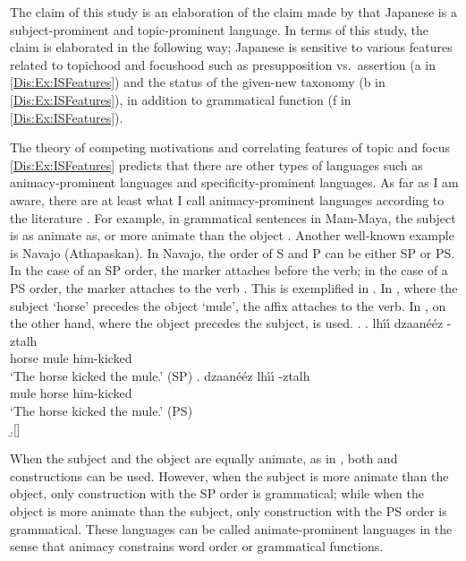 The claim of this study is an elaboration of the claim made by
 that
Japanese is a subject-prominent and topic-prominent language.
In terms of this study,
the claim is elaborated in the following way;
Japanese is sensitive to various features related to topichood and focushood such as presupposition vs.~assertion (a in \ref{Dis:Ex:ISFeatures})
and the status of the given-new taxonomy (b in \ref{Dis:Ex:ISFeatures}),
in addition to grammatical function (f in \ref{Dis:Ex:ISFeatures}).

The theory of competing motivations and correlating features of topic and focus \ref{Dis:Ex:ISFeatures} predicts that
there are other types of languages such as animacy-prominent languages and specificity-prominent languages.
As far as I am aware,
there are at least what I call animacy-prominent languages according to the literature \cite[]{dahlfraurud96,minkoff00,deswartetal07}.
For example, in grammatical sentences in Mam-Maya,
the subject is as animate as, or more animate than the object \cite{minkoff00}.
Another well-known example is Navajo (Athapaskan).
In Navajo, the order of S and P can be either SP or PS.
In the case of an SP order, the marker  attaches before the verb;
in the case of a PS order, the marker  attaches to the verb \cite{hale72,frischberg72}.
This is exemplified in \Next.
In \Next[a],
where the subject `horse' precedes the object `mule',
the affix  attaches to the verb.
In \Next[b], on the other hand,
where the object precedes the subject,
 is used.
%
\ex.
 \ag. lh\'{\i}\'{\i} dzaan\'e\'ez -ztalh \\
      horse mule him-kicked \\
      `The horse kicked the mule.' \hfill{(SP)}
 \bg. dzaan\'e\'ez lh\'{\i}\'{\i} -ztalh \\
      mule horse him-kicked \\
      `The horse kicked the mule.' \hfill{(PS)}\\
 \b.[] \hfill{\cite[300]{hale72}}

When the subject and the object are equally animate, as in \Last,
both  and  constructions can be used.
However,
when the subject is more animate than the object,
only construction with the SP order is grammatical;
while when the object is more animate than the subject,
only  construction with the PS order is grammatical.
These languages can be called animate-prominent languages
in the sense that
animacy constrains word order or grammatical functions.


